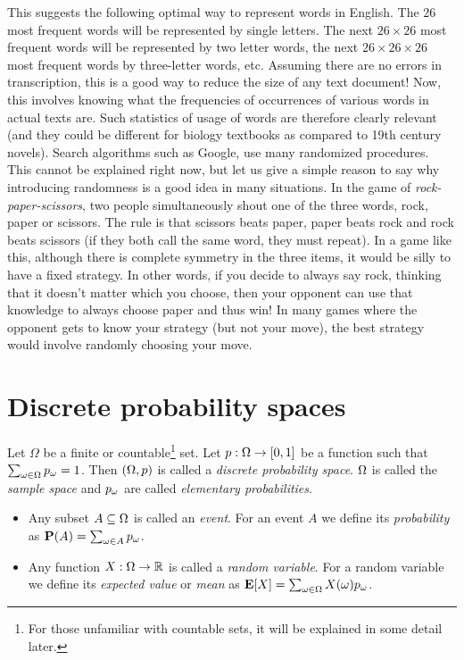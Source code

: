 \documentclass[preprint,  11pt]{amsart}
\begin{document}
This suggests the following optimal way to represent words in English. The 26 most frequent words will be represented by single letters. The next $26\times 26$ most frequent words will be represented by two letter words, the next $26\times 26\times 26$ most frequent words by three-letter words, etc. Assuming there are no errors in transcription, this is a good way to reduce the size of any text document! Now, this involves knowing what the frequencies of occurrences of various words in actual texts are. Such statistics of usage of words are therefore clearly relevant (and they could be different for biology textbooks as compared to 19th century novels).
\eeg
\beg Search algorithms such as Google, use many randomized procedures. This cannot be explained right now, but let us give a simple reason to say why introducing randomness is a good idea in many situations. In the game of {\em rock-paper-scissors}, two people simultaneously shout one of the three words, rock, paper or scissors. The rule is that scissors beats paper, paper beats rock and rock beats scissors (if they both call the same word, they must repeat). In a game like this, although there is complete symmetry in the three items, it would be silly to have a fixed strategy. In other words, if you decide to always say rock, thinking that it doesn't matter which you choose, then your opponent can use that knowledge to always choose paper and thus win! In many games where the opponent gets to know your strategy (but not your move), the best strategy would involve  randomly choosing your move.
\eeg


\section{Discrete probability spaces}
\begin{definition} Let $\Omega$ be a finite or countable\footnote{For those unfamiliar with countable sets, it will be explained in some detail later.} set. Let $p:\Omega\rightarrow [0,1]$ be a function such that $\sum_{\omega\in \Omega}p_{\omega}=1$. Then $(\Omega,p)$ is called a {\em discrete probability space}. $\Omega$ is called the {\em sample space} and $p_{\omega}$ are called {\em elementary probabilities}.
\begin{itemize}
\item Any subset $A\subseteq \Omega$ is called an {\em event}. For an event $A$ we define its {\em probability} as $\mathbf{P}(A)=\sum_{\omega\in A}p_{\omega}$.
\item Any function $X:\Omega\rightarrow \mathbb{R}$ is called a {\em random variable}.  For a random variable we define its {\em expected value} or {\em mean} as $\mathbf{E}[X]=\sum_{\omega \in \Omega}X(\omega)p_{\omega}$.
\end{itemize}
\end{definition}
\end{document}
